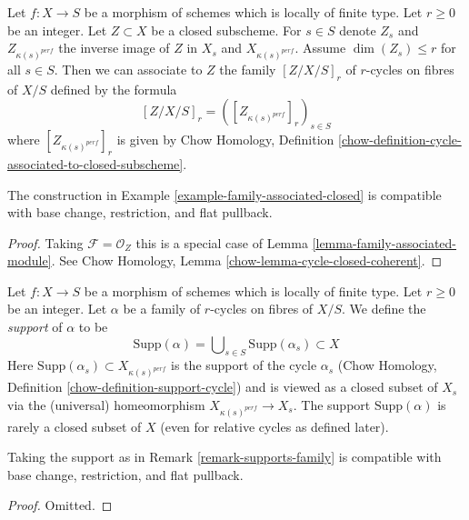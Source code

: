 \begin{example}
\label{example-family-associated-closed}
Let $f : X \to S$ be a morphism of schemes which is locally of finite type.
Let $r \geq 0$ be an integer. Let $Z \subset X$ be a closed subscheme.
For $s \in S$ denote $Z_s$ and $Z_{\kappa(s)^{perf}}$
the inverse image of $Z$ in $X_s$ and $X_{\kappa(s)^{perf}}$.
Assume $\dim(Z_s) \leq r$ for all $s \in S$.
Then we can associate to $Z$ the family $[Z/X/S]_r$
of $r$-cycles on fibres of $X/S$ defined by the formula
$$
[Z/X/S]_r = ([Z_{\kappa(s)^{perf}}]_r)_{s \in S}
$$
where $[Z_{\kappa(s)^{perf}}]_r$ is given by
Chow Homology, Definition
\ref{chow-definition-cycle-associated-to-closed-subscheme}.
\end{example}

\begin{lemma}
\label{lemma-family-associated-closed}
The construction in Example \ref{example-family-associated-closed}
is compatible with base change, restriction,
and flat pullback.
\end{lemma}

\begin{proof}
Taking $\mathcal{F} = \mathcal{O}_Z$ this is a special case of
Lemma \ref{lemma-family-associated-module}. See
Chow Homology, Lemma \ref{chow-lemma-cycle-closed-coherent}.
\end{proof}

\begin{remark}[Support]
\label{remark-supports-family}
Let $f : X \to S$ be a morphism of schemes which is locally of finite type.
Let $r \geq 0$ be an integer. Let $\alpha$ be a family of $r$-cycles
on fibres of $X/S$. We define the {\it support} of $\alpha$ to be
$$
\text{Supp}(\alpha) = \bigcup\nolimits_{s \in S} \text{Supp}(\alpha_s) \subset X
$$
Here $\text{Supp}(\alpha_s) \subset X_{\kappa(s)^{perf}}$ is the
support of the cycle $\alpha_s$
(Chow Homology, Definition \ref{chow-definition-support-cycle})
and is viewed as
a closed subset of $X_s$ via the (universal) homeomorphism
$X_{\kappa(s)^{perf}} \to X_s$. The support $\text{Supp}(\alpha)$
is rarely a closed subset of $X$ (even for relative cycles as
defined later).
\end{remark}

\begin{lemma}
\label{lemma-support-family}
Taking the support as in Remark \ref{remark-supports-family}
is compatible with base change, restriction, and flat pullback.
\end{lemma}

\begin{proof}
Omitted.
\end{proof}

